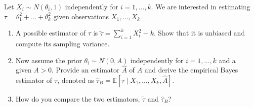 \begin{exercise}\label{probability:2018:10}
Let $X_i \sim N(\theta_i, 1)$ independently for $i = 1, \dots, k$. We are interested in estimating $\tau = \theta_1^2 + \dots + \theta_k^2$ given observations $X_1, \dots, X_k$.
\begin{enumerate}
    \item A possible estimator of $\tau$ is $\tilde{\tau} = \sum_{i=1}^k X_i^2 - k$. Show that it is unbiased and compute its sampling variance.
    \item Now assume the prior $\theta_i \sim N(0, A)$ independently for $i = 1, \dots, k$ and a given $A > 0$. Provide an estimator $\hat{A}$ of $A$ and derive the empirical Bayes estimator of $\tau$, denoted as $\hat{\tau}_B = \mathbb{E}[\tau \mid X_1, \dots, X_k, \hat{A}]$.
    \item How do you compare the two estimators, $\tilde{\tau}$ and $\hat{\tau}_B$?
\end{enumerate}
\end{exercise}

